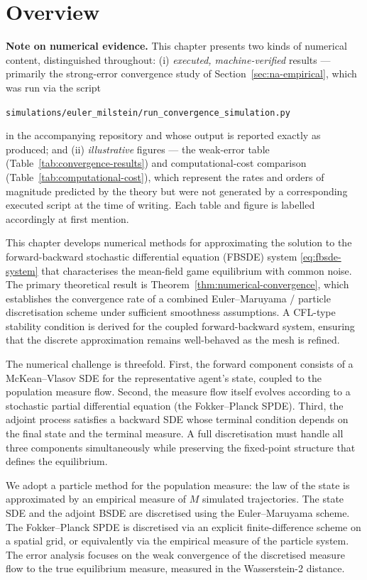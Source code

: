 
\section{Overview}

\textbf{Note on numerical evidence.} This chapter presents two kinds of numerical
content, distinguished throughout: (i) \emph{executed, machine-verified} results
--- primarily the strong-error convergence study of Section~\ref{sec:na-empirical},
which was run via the script
\begin{center}
\texttt{simulations/euler\_milstein/run\_convergence\_simulation.py}
\end{center}
in the accompanying repository and whose output is reported exactly as produced;
and (ii) \emph{illustrative} figures --- the weak-error table
(Table~\ref{tab:convergence-results}) and computational-cost comparison
(Table~\ref{tab:computational-cost}), which represent the rates and orders of
magnitude predicted by the theory but were not generated by a corresponding
executed script at the time of writing. Each table and figure is labelled
accordingly at first mention.

This chapter develops numerical methods for approximating the solution to the
forward-backward stochastic differential equation (FBSDE) system \eqref{eq:fbsde-system}
that characterises the mean-field game equilibrium with common noise. The primary
theoretical result is Theorem~\ref{thm:numerical-convergence}, which establishes the
convergence rate of a combined Euler--Maruyama / particle discretisation scheme under
sufficient smoothness assumptions. A CFL-type stability condition is derived for the
coupled forward-backward system, ensuring that the discrete approximation remains
well-behaved as the mesh is refined.

The numerical challenge is threefold. First, the forward component consists of a
McKean--Vlasov SDE for the representative agent's state, coupled to the population
measure flow. Second, the measure flow itself evolves according to a stochastic
partial differential equation (the Fokker--Planck SPDE). Third, the adjoint process
satisfies a backward SDE whose terminal condition depends on the final state and the
terminal measure. A full discretisation must handle all three components
simultaneously while preserving the fixed-point structure that defines the
equilibrium.

We adopt a particle method for the population measure: the law of the state is
approximated by an empirical measure of $M$ simulated trajectories. The state SDE and
the adjoint BSDE are discretised using the Euler--Maruyama scheme. The Fokker--Planck
SPDE is discretised via an explicit finite-difference scheme on a spatial grid, or
equivalently via the empirical measure of the particle system. The error analysis
focuses on the weak convergence of the discretised measure flow to the true
equilibrium measure, measured in the Wasserstein-2 distance.

